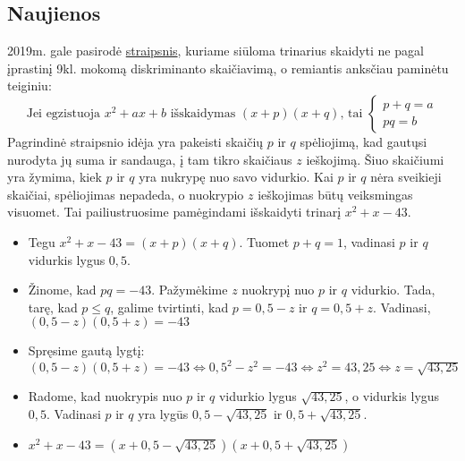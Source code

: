 \documentclass[a4paper]{article}
\begin{document}
 \subsection{Naujienos}
 2019m. gale pasirodė \href{https://www.poshenloh.com/quadraticdetail}{straipsnis}, kuriame siūloma trinarius skaidyti ne pagal įprastinį 9kl. mokomą diskriminanto skaičiavimą, o remiantis anksčiau paminėtu teiginiu:
 $$\text{Jei egzistuoja }x^2+ax+b \text{ išskaidymas } (x+p)(x+q)\text{, tai }\begin{cases} p+q=a \\ pq=b\end{cases}$$
Pagrindinė straipsnio idėja yra pakeisti skaičių $p$ ir $q$ spėliojimą, kad gautųsi nurodyta jų suma ir sandauga, į tam tikro skaičiaus $z$ ieškojimą. Šiuo skaičiumi yra žymima, kiek $p$ ir $q$ yra nukrypę nuo savo vidurkio. Kai $p$ ir $q$ nėra sveikieji skaičiai, spėliojimas nepadeda, o nuokrypio $z$ ieškojimas būtų veiksmingas visuomet. Tai pailiustruosime pamėgindami išskaidyti trinarį $x^2+x-43$. 

\begin{itemize}
\item Tegu $x^2+x-43 = (x+p)(x+q)$. Tuomet $p+q=1$, vadinasi $p$ ir $q$ vidurkis lygus $0,5$.
\item Žinome, kad $pq=-43$. Pažymėkime $z$ nuokrypį nuo $p$ ir $q$ vidurkio. Tada, tarę, kad $p\le q$, galime tvirtinti, kad $p=0,5-z$ ir $q=0,5+z$. Vadinasi, $(0,5-z)(0,5+z)=-43$
\item Spręsime gautą lygtį: $(0,5-z)(0,5+z)=-43 \Leftrightarrow 0,5^2 - z^2 = -43 \Leftrightarrow z^2 = 43,25 \Leftrightarrow z = \sqrt{43,25}$
\item Radome, kad nuokrypis nuo $p$ ir $q$ vidurkio lygus $\sqrt{43,25}$, o vidurkis lygus $0,5$. Vadinasi $p$ ir $q$ yra lygūs $0,5 - \sqrt{43,25}$ ir $0,5 + \sqrt{43,25}$.
\item $x^2+x-43 = (x+0,5-\sqrt{43,25})(x+0,5+\sqrt{43,25})$
\end{itemize}
\end{document}
